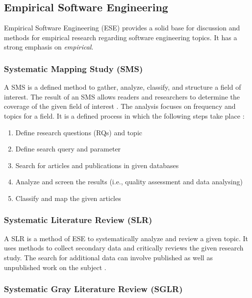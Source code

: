 \subsection{Empirical Software Engineering}

Empirical Software Engineering (ESE) provides a solid base for discussion and methods for empirical
research regarding software engineering topics. It has a strong emphasis on \textit{empirical}.

\subsubsection{Systematic Mapping Study (SMS)}

A SMS is a defined method to gather, analyze, classify, and structure a field of interest.
The result of an SMS allows readers and researchers to determine the coverage of the given
field of interest \cite{petersen:SMS}. The analysis focuses on frequency and topics for a
field. It is a defined process in which the following steps take place \cite{petersen:SMS}:

\begin{enumerate}
    \item Define research questions (RQs) and topic
    \item Define search query and parameter
    \item Search for articles and publications in given databases
    \item Analyze and screen the results (i.e., quality assessment and data analysing)
    \item Classify and map the given articles
\end{enumerate}

\subsubsection{Systematic Literature Review (SLR)}

A SLR is a method of ESE to systematically analyze and review a given topic. It uses
methods to collect secondary data and critically reviews the given research study.
The search for additional data can involve published as well as unpublished work
on the subject \cite{siddaway:SLR}.

\subsubsection{Systematic Gray Literature Review (SGLR)}

